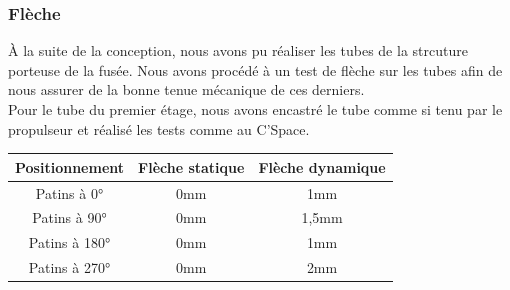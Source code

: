 \subsubsection{Flèche}
\label{subsubsec:premier_etage}
À la suite de la conception, nous avons pu réaliser les tubes de la strcuture porteuse de la fusée. Nous avons procédé à un test de flèche sur les tubes afin de nous assurer de la bonne tenue mécanique de ces derniers.\\
Pour le tube du premier étage, nous avons encastré le tube comme si tenu par le propulseur et réalisé les tests comme au C'Space. 
\begin{table}[h!]
\centering
\begin{tabular}{|c|c|c|}
\hline
Positionnement & Flèche statique & Flèche dynamique \\ \hline
Patins à 0° & 0mm & 1mm \\ \hline
Patins à 90° & 0mm & 1,5mm \\ \hline
Patins à 180° & 0mm & 1mm \\ \hline
Patins à 270° & 0mm & 2mm \\ \hline
\end{tabular}
\end{table}



